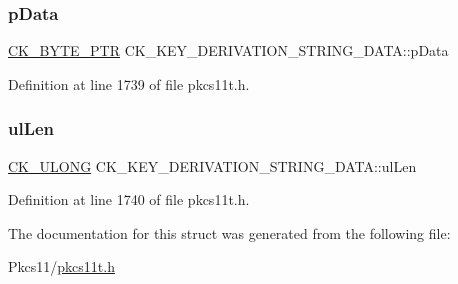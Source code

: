 \subsubsection{\texorpdfstring{p\+Data}{pData}}
{\footnotesize\ttfamily \hyperlink{pkcs11t_8h_a3d7233a4077fbaf7ae76b64da0a62a21}{C\+K\+\_\+\+B\+Y\+T\+E\+\_\+\+P\+TR} C\+K\+\_\+\+K\+E\+Y\+\_\+\+D\+E\+R\+I\+V\+A\+T\+I\+O\+N\+\_\+\+S\+T\+R\+I\+N\+G\+\_\+\+D\+A\+T\+A\+::p\+Data}



Definition at line 1739 of file pkcs11t.\+h.

\mbox{\label{struct_c_k___k_e_y___d_e_r_i_v_a_t_i_o_n___s_t_r_i_n_g___d_a_t_a_a11068ec8d8e05a164dd2bb2bbeddf924}} 
\subsubsection{\texorpdfstring{ul\+Len}{ulLen}}
{\footnotesize\ttfamily \hyperlink{pkcs11t_8h_a35181858a3b7a0a81f49d180d8f446ef}{C\+K\+\_\+\+U\+L\+O\+NG} C\+K\+\_\+\+K\+E\+Y\+\_\+\+D\+E\+R\+I\+V\+A\+T\+I\+O\+N\+\_\+\+S\+T\+R\+I\+N\+G\+\_\+\+D\+A\+T\+A\+::ul\+Len}



Definition at line 1740 of file pkcs11t.\+h.



The documentation for this struct was generated from the following file\+:\begin{DoxyCompactItemize}
\item 
Pkcs11/\hyperlink{pkcs11t_8h}{pkcs11t.\+h}\end{DoxyCompactItemize}
